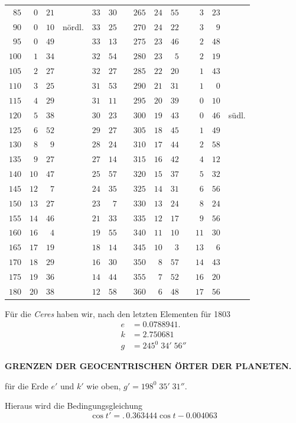 \begin{center}
\begin{tabular}{r|rrl|rrl||r|rrl|rrl}
$85$&$0$&$21$&&$33$&$30$&&$265$&$24$&$55$&&$3$&$23$&\\
$90$&$0$&$10$&nördl.&$33$&$25$&&$270$&$24$&$22$&&$3$&$9$&\\[3pt]
$95$&$0$&$49$&&$33$&$13$&&$275$&$23$&$46$&&$2$&$48$&\\
$100$&$1$&$34$&&$32$&$54$&&$280$&$23$&$5$&&$2$&$19$&\\
$105$&$2$&$27$&&$32$&$27$&&$285$&$22$&$20$&&$1$&$43$&\\
$110$&$3$&$25$&&$31$&$53$&&$290$&$21$&$31$&&$1$&$0$&\\
$115$&$4$&$29$&&$31$&$11$&&$295$&$20$&$39$&&$0$&$10$&\\
$120$&$5$&$38$&&$30$&$23$&&$300$&$19$&$43$&&$0$&$46$&südl.\\[3pt]
$125$&$6$&$52$&&$29$&$27$&&$305$&$18$&$45$&&$1$&$49$&\\
$130$&$8$&$9$&&$28$&$24$&&$310$&$17$&$44$&&$2$&$58$&\\
$135$&$9$&$27$&&$27$&$14$&&$315$&$16$&$42$&&$4$&$12$&\\
$140$&$10$&$47$&&$25$&$57$&&$320$&$15$&$37$&&$5$&$32$&\\
$145$&$12$&$7$&&$24$&$35$&&$325$&$14$&$31$&&$6$&$56$&\\
$150$&$13$&$27$&&$23$&$7$&&$330$&$13$&$24$&&$8$&$24$&\\[3pt]
$155$&$14$&$46$&&$21$&$33$&&$335$&$12$&$17$&&$9$&$56$&\\
$160$&$16$&$4$&&$19$&$55$&&$340$&$11$&$10$&&$11$&$30$&\\
$165$&$17$&$19$&&$18$&$14$&&$345$&$10$&$3$&&$13$&$6$&\\
$170$&$18$&$29$&&$16$&$30$&&$350$&$8$&$57$&&$14$&$43$&\\
$175$&$19$&$36$&&$14$&$44$&&$355$&$7$&$52$&&$16$&$20$&\\
$180$&$20$&$38$&&$12$&$58$&&$360$&$6$&$48$&&$17$&$56$&
\end{tabular}
\endgroup
\end{center}

Für die \textit{Ceres} haben wir, nach den letzten Elementen für 1803
\[
\begin{aligned}
e&=0.0788941.\\
k&=2.750681\\
g&=245^0\;34'\;56''
\end{aligned}
\]
\par\clearpage
\endgroup
\begingroup
\pagestyle{empty}
\noindent{}%
\makebox[12mm][l]{}%
\parbox[t]{\dimexpr\linewidth-24mm\relax}{\centering\fontsize{7.4}{9.2}\selectfont\bfseries GRENZEN DER GEOCENTRISCHEN ÖRTER DER PLANETEN.\par}%
\par\nobreak\smallskip
\noindent für die Erde $e'$ und $k'$ wie oben, $g'=198^0\;35'\;31''$.\par
\noindent Hieraus wird die Bedingungsgleichung
\[
\cos t'=.\,0.363444\cos t-0.004063
\]

